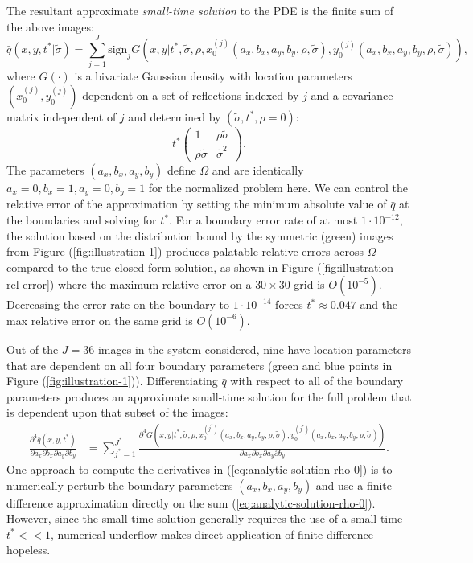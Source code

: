 \documentclass[10pt]{article}
\begin{document}
The resultant approximate \textit{small-time solution} to the PDE is
the finite sum of the above images:
\begin{equation}
  \bar{q}(x, y, t^{*}|\tilde{\sigma}) = \sum_{j=1}^J \mbox{sign}_j
  G(x,y|t^*, \tilde{\sigma}, \rho, x_0^{(j)}(a_x, b_x, a_y, b_y, \rho, \tilde{\sigma}),
  y_0^{(j)}(a_x, b_x, a_y, b_y, \rho, \tilde{\sigma})), \label{eq:small-time-sol}
\end{equation}
where $G(\cdot)$ is a bivariate Gaussian density with location
parameters $(x^{(j)}_0,y^{(j)}_0)$ dependent on a set of reflections indexed by $j$ and a
covariance matrix independent of $j$ and determined by
$(\tilde{\sigma}, t^*, \rho = 0)$:
\[
  t^{*} \left( \begin{array}{cc}
                 1 & \rho\tilde{\sigma} \\
                 \rho\tilde{\sigma} & \tilde{\sigma}^2
               \end{array} \right).
\]
The parameters $(a_x,b_x,a_y,b_y)$ define $\Omega$ and are identically
$a_x =0, b_x=1, a_y=0,b_y=1$ for the normalized problem here. We can
control the relative error of the approximation by setting the minimum
absolute value of $\bar{q}$ at the boundaries and solving for
$t^{*}$. For a boundary error rate of at most $1 \cdot 10^{-12}$, the
solution based on the distribution bound by the symmetric (green)
images from Figure (\ref{fig:illustration-1}) produces palatable
relative errors across $\Omega$ compared to the true closed-form
solution, as shown in Figure (\ref{fig:illustration-rel-error}) where
the maximum relative error on a $30 \times 30$ grid is $O(10^{-5})$.
Decreasing the error rate on the boundary to $1 \cdot 10^{-14}$ forces
$t^* \approx 0.047$ and the max relative error on the same grid is
$O(10^{-6})$.

Out of the $J=36$ images in the system considered, nine have location
parameters that are dependent on all four boundary parameters (green
and blue points in Figure (\ref{fig:illustration-1})). Differentiating
$\bar{q}$ with respect to all of the boundary parameters produces an
approximate small-time solution for the full problem that is dependent
upon that subset of the images:
\begin{align}
  \frac{\partial^4 \bar{q}(x, y, t^{*})}{\partial a_x
  \partial b_x \partial a_y \partial b_y} &= \sum_{j^*=1}^{J^*} \frac{\partial^4
                                            G(x,y|t^{*}, \tilde{\sigma}, \rho, x_0^{(j^*)}(a_x, b_x, a_y, b_y, \rho, \tilde{\sigma}),
                                            y_0^{(j^*)}(a_x, b_x, a_y, b_y, \rho, \tilde{\sigma}))} {\partial a_x \partial b_x
                                            \partial a_y \partial b_y}. \label{eq:analytic-solution-rho-0}
\end{align}
One approach to compute the derivatives in
(\ref{eq:analytic-solution-rho-0}) is to numerically perturb the
boundary parameters $(a_x,b_x,a_y,b_y)$ and use a finite difference
approximation directly on the sum
(\ref{eq:analytic-solution-rho-0}). However, since the small-time
solution generally requires the use of a small time $t^* << 1$,
numerical underflow makes direct application of finite difference
hopeless.
\end{document}
